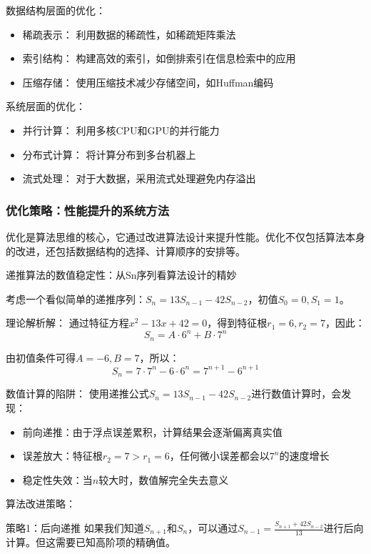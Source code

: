 数据结构层面的优化：
\begin{itemize}
\item 稀疏表示： 利用数据的稀疏性，如稀疏矩阵乘法
\item 索引结构： 构建高效的索引，如倒排索引在信息检索中的应用
\item 压缩存储： 使用压缩技术减少存储空间，如Huffman编码
\end{itemize}

系统层面的优化：
\begin{itemize}
\item 并行计算： 利用多核CPU和GPU的并行能力
\item 分布式计算： 将计算分布到多台机器上
\item 流式处理： 对于大数据，采用流式处理避免内存溢出
\end{itemize}

\subsubsection{优化策略：性能提升的系统方法}

优化是算法思维的核心，它通过改进算法设计来提升性能。优化不仅包括算法本身的改进，还包括数据结构的选择、计算顺序的安排等。

递推算法的数值稳定性：从Sn序列看算法设计的精妙

考虑一个看似简单的递推序列：$S_n = 13S_{n-1} - 42S_{n-2}$，初值$S_0 = 0, S_1 = 1$。

理论解析解：
通过特征方程$x^2 - 13x + 42 = 0$，得到特征根$r_1 = 6, r_2 = 7$，因此：
$$S_n = A \cdot 6^n + B \cdot 7^n$$

由初值条件可得$A = -6, B = 7$，所以：
$$S_n = 7 \cdot 7^n - 6 \cdot 6^n = 7^{n+1} - 6^{n+1}$$

数值计算的陷阱：
使用递推公式$S_n = 13S_{n-1} - 42S_{n-2}$进行数值计算时，会发现：

\begin{itemize}
\item 前向递推：由于浮点误差累积，计算结果会逐渐偏离真实值
\item 误差放大：特征根$r_2 = 7 > r_1 = 6$，任何微小误差都会以$7^n$的速度增长
\item 稳定性失效：当$n$较大时，数值解完全失去意义
\end{itemize}

算法改进策略：

策略1：后向递推
如果我们知道$S_{n+1}$和$S_n$，可以通过$S_{n-1} = \frac{S_{n+1} + 42S_{n-2}}{13}$进行后向计算。但这需要已知高阶项的精确值。


